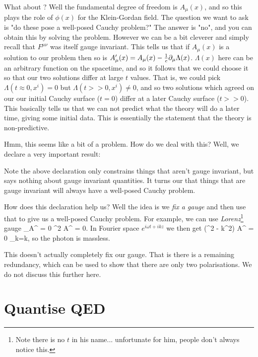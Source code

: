 What about ? Well the fundamental degree of freedom is $A_{\mu}(x)$, and so this plays the role of $\phi(x)$ for the Klein-Gordan field. The question we want to ask is "do these pose a well-posed Cauchy problem?" The answer is "no", and you can obtain this by solving the problem. However we can be a bit cleverer and simply recall that $F^{\mu\nu}$ was itself gauge invariant. This tells us that if $A_{\mu}(x)$ is a solution to our problem then so is $A_{\mu}'(x) = A_{\mu}(x) -\frac{1}{e}\partial_{\mu}\Lambda(x)$. $\Lambda(x)$ here can be an arbitrary function on the spacetime, and so it follows that we could choose it so that our two solutions differ at large $t$ values. That is, we could pick $\Lambda(t\approx0,x^i)=0$ but $\Lambda(t >>0, x^i) \neq 0$, and so two solutions which agreed on our our initial Cauchy surface ($t=0$) differ at a later Cauchy surface ($t >>0$). This basically tells us that we can not predict what the theory will do a later time, giving some initial data. This is essentially the statement that the theory is non-predictive. 

Hmm, this seems like a bit of a problem. How do we deal with this? Well, we declare a very important result:

\br 
    Note the above declaration only constrains things that aren't gauge invariant, but says nothing about gauge invariant quantities. It turns our that things that are gauge invariant will always have a well-posed Cauchy problem. 
\er 

How does this declaration help us? Well the idea is we \textit{fix a gauge} and then use that to give us a well-posed Cauchy problem. For example, we can use \textit{Lorenz}\footnote{Note there is no $t$ in his name... unfortunate for him, people don't always notice this. } gauge 
\bse 
    \p_{\mu}A^{\mu} = 0 \qquad \implies \qquad \p^2 A^{\nu} = 0.  
\ese
In Fourier space $e^{i\omega t+ ikz}$ we then get 
\bse 
    (\omega^2 - k^2) A^{\nu} = 0 \qquad \implies \qquad \omega_k=k,
\ese 
so the photon is massless. 

\br 
    This doesn't actually completely fix our gauge. That is there is a remaining redundancy, which can be used to show that there are only two polarisations. We do not discuss this further here.
\er 

\section{Quantise QED}

